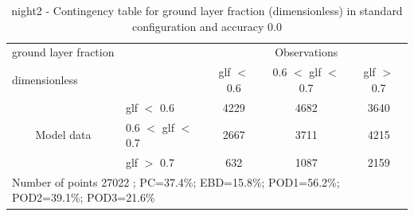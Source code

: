 \begin{table}[p!]
\begin{center}
\begin{tabular}{llccc}
\hline
{ground layer fraction}                                       &                                                    & \multicolumn{3}{c}{Observations}                 \\
{dimensionless}                                       &                             & glf $<$ 0.6   & 0.6 $<$ glf $<$ 0.7 & glf $>$ 0.7 \\
\hline
\multicolumn{1}{c}{\multirow{3}{*}{Model data}}  & glf $<$ 0.6             & 4229                & 4682                       & 3640              \\
                                                 & 0.6  $<$ glf $<$ 0.7 & 2667                & 3711                       & 4215              \\
                                                 & glf $>$ 0.7             & 632                & 1087                       & 2159              \\
\hline
\multicolumn{5}{l}{ Number of points        27022 ; PC=37.4\%; EBD=15.8\%; POD1=56.2\%; POD2=39.1\%; POD3=21.6\%}
\end{tabular}
\end{center}
\caption{night2 - Contingency table for  ground layer fraction (dimensionless) in standard configuration and accuracy 0.0}
\label{tab:contingencyglfBEF:night2}
\end{table}
